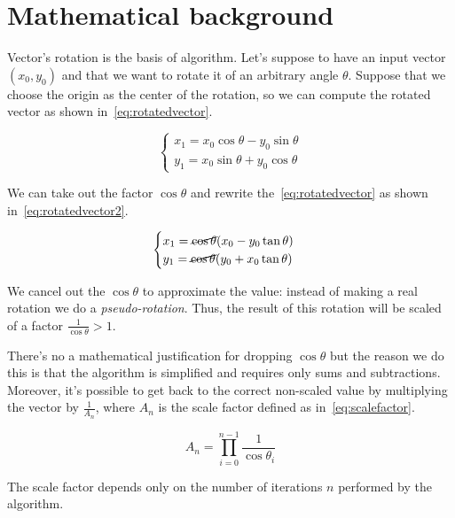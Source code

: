 \section{Mathematical background}\label{sec:math}

Vector's rotation is the basis of \cordic{} algorithm. Let's suppose to have an
input vector \((x_0, y_0)\) and that we want to rotate it of an arbitrary angle
\(\theta\). Suppose that we choose the origin as the center of the rotation, so
we can compute the rotated vector as shown in~\eqref{eq:rotatedvector}.

\begin{equation}\label{eq:rotatedvector}
	\begin{cases}
		x_1 = x_0\cos\theta - y_0\sin\theta\\
		y_1 = x_0\sin\theta + y_0\cos\theta
	\end{cases}
\end{equation}

We can take out the factor \(\cos\theta\) and rewrite
the~\eqref{eq:rotatedvector} as shown in~\eqref{eq:rotatedvector2}.

\begin{equation}\label{eq:rotatedvector2}
	\begin{cases}
		x_1 = \cancel{\cos\theta}(x_0 - y_0\tan\theta)\\
		y_1 = \cancel{\cos\theta}(y_0 + x_0\tan\theta)
	\end{cases}
\end{equation}

We cancel out the \(\cos\theta\) to approximate the value: instead of making a
real rotation we do a \emph{pseudo-rotation}. Thus, the result of this rotation
will be scaled of a factor \(\frac{1}{\cos\theta} > 1\).

There's no a mathematical justification for dropping \(\cos\theta\) but the
reason we do this is that the algorithm is simplified and requires only sums and
subtractions. Moreover, it's possible to get back to the correct non-scaled
value by multiplying the vector by \(\frac{1}{A_n}\), where \(A_n\) is the scale
factor defined as in~\eqref{eq:scalefactor}.

\begin{equation}\label{eq:scalefactor}
	A_n = \prod_{i=0}^{n-1} \frac{1}{\cos\theta_i}
\end{equation}

The scale factor depends only on the number of iterations \(n\) performed by the
algorithm.

